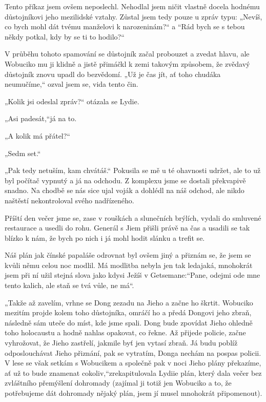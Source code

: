 Tento příkaz jsem ovšem neposlechl. Nehodlal jsem ničit vlastně docela hodnému důstojníkovi jeho mezilidské vztahy. Zůstal jsem tedy pouze u zpráv typu: „Nevíš, co bych mohl dát tvému manželovi k narozeninám?“ a “Rád bych se s tebou někdy potkal, kdy by se ti to hodilo?“ 

V průběhu tohoto spamování se důstojník začal probouzet a zvedat hlavu, ale Wobuciko mu ji klidně a jistě přimáčkl k zemi takovým způsobem, že zvědavý důstojník znovu upadl do bezvědomí. „Už je čas jít, ať toho chudáka neumučíme,“ ozval jsem se, vida tento čin.

„Kolik jsi odeslal zpráv?“ otázala se Lydie.

„Asi padesát,“já na to.

„A kolik má přátel?“

„Sedm set.“

„Pak tedy netuším, kam chvátáš.“ Pokusila se mě u té ohavnosti udržet, ale to už byl počítač vypnutý a já na odchodu. Z komplexu jsme se dostali překvapivě snadno. Na chodbě se nás sice ujal voják a dohlédl na náš odchod, ale nikdo naštěstí nekontroloval svého nadřízeného.
	
Příští den večer jsme se, zase v rouškách a slunečních brýlích, vydali do smluvené restaurace a usedli do rohu. Generál s Jiem přišli právě na čas a usadili se tak blízko k nám, že bych po nich i já mohl hodit slánku a trefit se. 

Náš plán jak čínské papaláše odrovnat byl ovšem jiný a přiznám se, že jsem se kvůli němu celou noc modlil. Má modlitba nebyla jen tak ledajaká, mnohokrát jsem při ní užil stejná slova jako kdysi Ježíš v Getsemane:“Pane, odejmi ode mne tento kalich, ale staň se tvá vůle, ne má“. 

 „Takže až zavelím, vrhne se Dong zezadu na Jieho a začne ho škrtit. Wobuciko mezitím projde kolem toho důstojníka, omráčí ho a předá Dongovi jeho zbraň, následně sám uteče do míst, kde jsme spali. Dong bude zpovídat Jieho ohledně toho holocaustu a hodně nahlas opakovat, co řekne. Až přijede policie, začne vyhrožovat, že Jieho zastřelí, jakmile byť jen vytasí zbraň. Já budu poblíž odposlouchávat Jieho přiznání, pak se vytratím, Donga nechám na pospas policii. V lese se však setkám s Wobucikem a společně pak v noci Jieho plány překazíme, ať už to bude znamenat cokoliv,“zrekapitulovala Lydiie plán, který dala večer bez zvláštního přemýšlení dohromady (zajímal ji totiž jen Wobuciko a to, že potřebujeme dát dohromady nějaký plán, jsem jí musel mnohokrát připomenout).
 

